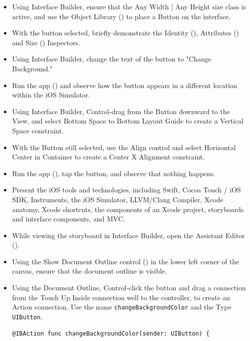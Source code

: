 \documentclass[a4paper,11pt]{scrartcl}
\begin{document}
\begin{itemize}
\item Using Interface Builder, ensure that the Any Width | Any Height size class is active, and use the Object Library () to place a Button on the interface.
\item With the button selected, briefly demonstrate the Identity (), Attributes () and Size () Inspectors.
\item Using Interface Builder, change the text of the button to "Change Background."
\item Run the app () and observe how the button appears in a different location within the iOS Simulator.
\item Using Interface Builder, Control-drag from the Button downward to the View, and select Bottom Space to Bottom Layout Guide to create a Vertical Space constraint.
\item With the Button still selected, use the Align control and select Horizontal Center in Container to create a Center X Alignment constraint.
\item Run the app (), tap the button, and observe that nothing happens.
\item Present the iOS tools and technologies, including Swift, Cocoa Touch / iOS SDK, Instruments, the iOS Simulator, LLVM/Clang Compiler, Xcode anatomy, Xcode shortcuts, the components of an Xcode project, storyboards and interface components, and MVC.
\item While viewing the storyboard in Interface Builder, open the Assistant Editor (\keys{\Alt+\cmd+\return}).
\item Using the Show Document Outline control () in the lower left corner of the canvas, ensure that the document outline is visible.
\item Using the Document Outline, Control-click the button and drag a connection from the Touch Up Inside connection well to the controller, to create an Action connection. Use the name \texttt{changeBackgroundColor} and the Type \texttt{UIButton}.
\begin{lstlisting}
@IBAction func changeBackgroundColor(sender: UIButton) {


\end{lstlisting}
\end{itemize}
\end{document}
